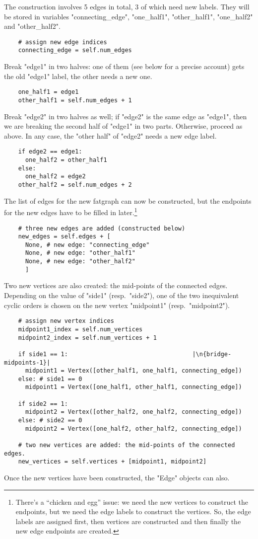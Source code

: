 The construction involves 5 edges in total, 3 of which need new
labels. They will be stored in variables "connecting_edge",
"one_half1", "other_half1", "one_half2" and "other_half2".
\begin{lstlisting}
    # assign new edge indices
    connecting_edge = self.num_edges
\end{lstlisting}
Break "edge1" in two halves: one of them (see below for a precise
account) gets the old "edge1" label, the other needs a new one.
\begin{lstlisting}
    one_half1 = edge1
    other_half1 = self.num_edges + 1
\end{lstlisting}
Break "edge2" in two halves as well; if "edge2" is the same edge as
"edge1", then we are breaking the second half of "edge1" in
two parts.  Otherwise, proceed as above.  In any case, the
"other half" of "edge2" needs a new edge label.
\begin{lstlisting}
    if edge2 == edge1:
      one_half2 = other_half1
    else:
      one_half2 = edge2
    other_half2 = self.num_edges + 2

\end{lstlisting}
The list of edges for the new fatgraph can now be constructed, but the
endpoints for the new edges have to be filled in
later.\footnote{There's a ``chicken and egg'' issue: we need the
  new vertices to construct the endpoints, but we need the edge labels
  to construct the vertices.  So, the edge labels are assigned first,
  then vertices are constructed and then finally the new edge
  endpoints are created.\label{fn:chicken-and-egg}}
\begin{lstlisting}
    # three new edges are added (constructed below)
    new_edges = self.edges + [
      None, # new edge: "connecting_edge"
      None, # new edge: "other_half1"
      None, # new edge: "other_half2"
      ]
\end{lstlisting}

Two new vertices are also created: the mid-points of the connected
edges. Depending on the value of "side1" (resp.~"side2"), one of the
two inequivalent cyclic orders is chosen on the new vertex "midpoint1"
(resp.~"midpoint2").
\begin{lstlisting}
    # assign new vertex indices
    midpoint1_index = self.num_vertices
    midpoint2_index = self.num_vertices + 1

    if side1 == 1:                                   |\n{bridge-midpoints-1}|
      midpoint1 = Vertex([other_half1, one_half1, connecting_edge])
    else: # side1 == 0
      midpoint1 = Vertex([one_half1, other_half1, connecting_edge])

    if side2 == 1:
      midpoint2 = Vertex([other_half2, one_half2, connecting_edge])
    else: # side2 == 0
      midpoint2 = Vertex([one_half2, other_half2, connecting_edge])

    # two new vertices are added: the mid-points of the connected edges.
    new_vertices = self.vertices + [midpoint1, midpoint2]

\end{lstlisting}
Once the new vertices have been constructed, the "Edge" objects can
also.

